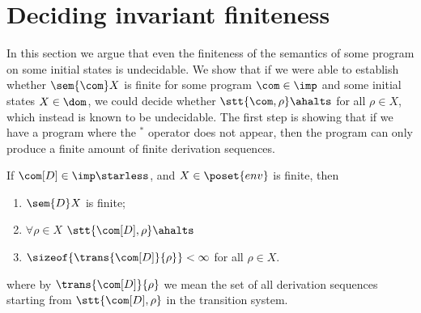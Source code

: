 \section{Deciding invariant finiteness}\label{sec:finiteness}

In this section we argue that even the finiteness of the semantics of
some program on some initial states is undecidable. We show that if we
were able to establish whether \(\sem{\com}X\) is finite for some
program \(\com\in\imp\) and some initial states \(X\in \dom\), we
could decide whether \(\stt{\com, \rho}\ahalts\) for all
\(\rho \in X\), which instead is known to be undecidable. The first
step is showing that if we have a program where the \(^*\) operator
does not appear, then the program can only produce a finite amount of
finite derivation sequences.

\begin{lemma}\label{le:finiteness}
  If \(\com[D]\in\imp\starless\), and \(X \in \poset{env}\) is
  finite, then
  \begin{enumerate}[label=(\roman*).,ref=\thetheorem.(\roman*)]
  \item\label{eq:fini} \(\sem{D}X\) is finite;
  \item\label{eq:finii} \(\forall \rho \in X\) \(\stt{\com[D], \rho}\ahalts\)
  \item\label{eq:finiii} \(\sizeof{\trans{\com[D]}{\rho}} < \infty\) for all
    \(\rho \in X\).
  \end{enumerate}

  where by \(\trans{\com[D]}{\rho}\) we mean the set of all derivation
  sequences starting from \(\stt{\com[D], \rho}\) in the transition
  system.
\end{lemma}

